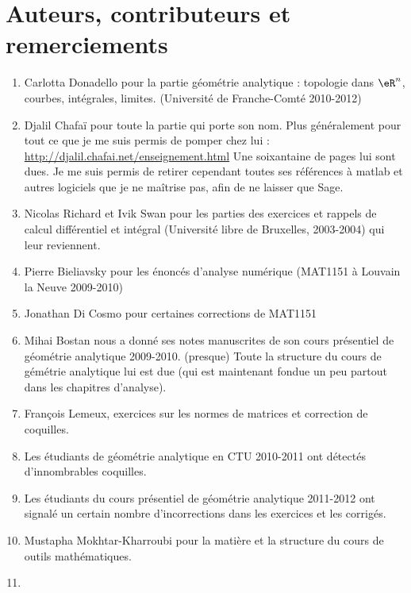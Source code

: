 \section*{Auteurs, contributeurs et remerciements}

\begin{enumerate}
    \item Carlotta Donadello pour la partie géométrie analytique : topologie dans \( \eR^n\), courbes, intégrales, limites. (Université de Franche-Comté 2010-2012)
    \item Djalil Chafaï pour toute la partie qui porte son nom. Plus généralement pour tout ce que je me suis permis de pomper chez lui :\\ \href{http://djalil.chafai.net/enseignement.html}{http://djalil.chafai.net/enseignement.html} Une soixantaine de pages lui sont dues. Je me suis permis de retirer cependant toutes ses références à matlab et autres logiciels que je ne maîtrise pas, afin de ne laisser que Sage.
    \item Nicolas Richard et Ivik Swan pour les parties des exercices et rappels de calcul différentiel et intégral (Université libre de Bruxelles, 2003-2004) qui leur reviennent.
    \item Pierre Bieliavsky pour les énoncés d'analyse numérique (MAT1151 à Louvain la Neuve 2009-2010)
    \item Jonathan Di Cosmo pour certaines corrections de MAT1151
    \item
        Mihai Bostan nous a donné ses notes manuscrites de son cours présentiel de géométrie analytique 2009-2010. (presque) Toute la structure du cours de gémétrie analytique lui est due (qui est maintenant fondue un peu partout dans les chapitres d'analyse).
    \item
        François Lemeux, exercices sur les normes de matrices et correction de coquilles.
    \item
        Les étudiants de géométrie analytique en CTU 2010-2011 ont détectés d'innombrables coquilles.
    \item
        Les étudiants du cours présentiel de géométrie analytique 2011-2012 ont signalé un certain nombre d'incorrections dans les exercices et les corrigés.
    \item
        Mustapha Mokhtar-Kharroubi pour la matière et la structure du cours de outils mathématiques.
    \item

\end{enumerate}
